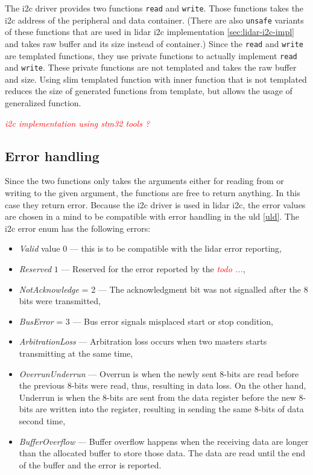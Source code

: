 \documentclass[
  digital,     %
  oneside,     %
  nosansbold,  %
  nocolorbold, %
  lof,         %
  lot,         %
]{fithesis4}
\newcommand{\TODO}[1]{\textcolor{red}{\textit{#1}}}
\begin{document}
{{{The \acrshort{i2c} driver provides two functions \lstinline|read| and \lstinline|write|. Those functions takes the \acrshort{i2c} address of the peripheral and data container. (There are also \lstinline|unsafe| variants of these functions that are used in \acrshort{lidar} \acrshort{i2c} implementation \ref{sec:lidar-i2c-impl} and takes raw buffer and its size instead of container.) Since the \lstinline|read| and \lstinline|write| are templated functions, they use private functions to actually implement \lstinline|read| and \lstinline|write|. These private functions are not templated and takes the raw buffer and size. Using slim templated function with inner function that is not templated reduces the size of generated functions from template, but allows the usage of generalized function.

\TODO{i2c implementation using stm32 tools ?}

\subsection{ Error handling }
Since the two functions only takes the arguments either for reading from or writing to the given argument, the functions are free to return anything. In this case they return error. Because the \acrshort{i2c} driver is used in \acrshort{lidar} \acrshort{i2c}, the error values are chosen in a mind to be compatible with error handling in the \acrshort{uld} \ref{uld}. The \acrshort{i2c} error enum has the following errors:
\begin{itemize}
    \item \emph{Valid} value $0$ --- this is to be compatible with the \acrshort{lidar} error reporting,
    \item \emph{Reserved} $1$ --- Reserved for the error reported by the \TODO{todo ...},
    \item \emph{NotAcknowledge} = 2 --- The acknowledgment bit was not signalled after the 8 bits were transmitted,
    \item \emph{BusError} = 3 --- Bus error signals misplaced start or stop condition,
    \item \emph{ArbitrationLoss} --- Arbitration loss occurs when two masters starts transmitting at the same time,
    \item \emph{OverrunUnderrun} --- Overrun is when the newly sent 8-bits are read before the previous 8-bits were read, thus, resulting in data loss. On the other hand, Underrun is when the 8-bits are sent from the data register before the new 8-bits are written into the register, resulting in sending the same 8-bits of data second time,
    \item \emph{BufferOverflow} --- Buffer overflow happens when the receiving data are longer than the allocated buffer to store those data. The data are read until the end of the buffer and the error is reported.
\end{itemize}

}}}
\end{document}
